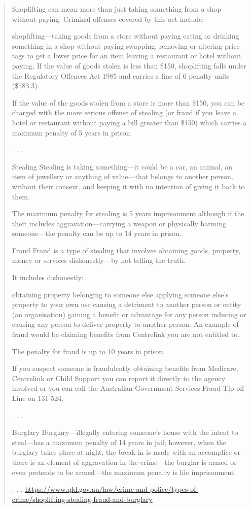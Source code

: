 \documentclass[11pt]{article}
\begin{document}
\begin{quote}
Shoplifting can mean more than just taking something from a shop without paying. Criminal offenses covered by this act include:

shoplifting—taking goods from a store without paying
eating or drinking something in a shop without paying
swapping, removing or altering price tags to get a lower price for an item
leaving a restaurant or hotel without paying.
If the value of goods stolen is less than \$150, shoplifting falls under the Regulatory Offences Act 1985 and carries a fine of 6 penalty units (\$783.3).

If the value of the goods stolen from a store is more than \$150, you can be charged with the more serious offense of stealing (or fraud if you leave a hotel or restaurant without paying a bill greater than \$150) which carries a maximum penalty of 5 years in prison.

. . . 

Stealing
Stealing is taking something—it could be a car, an animal, an item of jewellery or anything of value—that belongs to another person, without their consent, and keeping it with no intention of giving it back to them.

The maximum penalty for stealing is 5 years imprisonment although if the theft includes aggravation—carrying a weapon or physically harming someone—the penalty can be up to 14 years in prison.

Fraud
Fraud is a type of stealing that involves obtaining goods, property, money or services dishonestly—by not telling the truth.

It includes dishonestly:

obtaining property belonging to someone else
applying someone else's property to your own use
causing a detriment to another person or entity (an organisation)
gaining a benefit or advantage for any person
inducing or causing any person to deliver property to another person.
An example of fraud would be claiming benefits from Centrelink you are not entitled to.

The penalty for fraud is up to 10 years in prison.

If you suspect someone is fraudulently obtaining benefits from Medicare, Centrelink or Child Support you can report it directly to the agency involved or you can call the Australian Government Services Fraud Tip-off Line on 131 524.

. . .

Burglary
Burglary—illegally entering someone’s house with the intent to steal—has a maximum penalty of 14 years in jail; however, when the burglary takes place at night, the break-in is made with an accomplice or there is an element of aggravation in the crime—the burglar is armed or even pretends to be armed—the maximum penalty is life imprisonment.

. . .
\url{https://www.qld.gov.au/law/crime-and-police/types-of-crime/shoplifting-stealing-fraud-and-burglary}
\end{quote}
\end{document}
